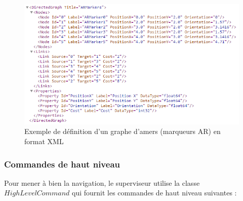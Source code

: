 \documentclass[10pt,a4paper]{article}
\begin{document}
\begin{figure}[!h]
\centering\includegraphics[scale=0.7]{figures/graphe_xml.png}
\caption{Exemple de définition d'un graphe d'amers (marqueurs AR) en format XML}
\label{graphe_xml}
\end{figure}

\newpage
\subsubsection{Commandes de haut niveau}
\label{sec:commandesDeHautNiveau}

Pour mener à bien la navigation, le superviseur utilise la classe $HighLevelCommand$ qui fournit les commandes de haut niveau suivantes :
\end{document}
